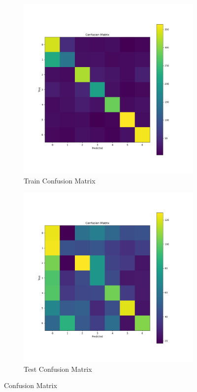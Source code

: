 \documentclass{article}
\begin{document}
\begin{figure}[h!]
    \centering
    \begin{subfigure}{0.45\textwidth}
        \includegraphics[width=\textwidth]{./pic/confusion_matrix_3041.png}
        \caption{Train Confusion Matrix}
        \label{fig:confusion_matrix_train_aug}
    \end{subfigure}
    \hfill %
    \begin{subfigure}{0.45\textwidth}
        \includegraphics[width=\textwidth]{./pic/confusion_matrix_2723_1.png}
        \caption{Test Confusion Matrix}
        \label{fig:confusion_matrix_test_aug}
    \end{subfigure}
    \caption{Confusion Matrix}
\end{figure}
\end{document}
